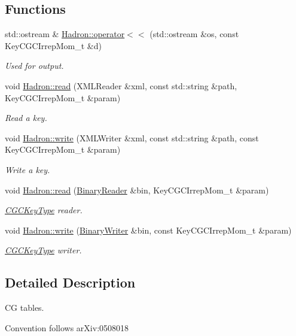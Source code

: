 \subsection*{Functions}
\begin{DoxyCompactItemize}
\item 
std\+::ostream \& \mbox{\hyperlink{namespaceHadron_aa163d93f390345d74a2db05417fba452}{Hadron\+::operator$<$$<$}} (std\+::ostream \&os, const Key\+C\+G\+C\+Irrep\+Mom\+\_\+t \&d)
\begin{DoxyCompactList}\small\item\em Used for output. \end{DoxyCompactList}\item 
void \mbox{\hyperlink{namespaceHadron_ab8d127a4d4a1ca38aae1b0d45226789e}{Hadron\+::read}} (X\+M\+L\+Reader \&xml, const std\+::string \&path, Key\+C\+G\+C\+Irrep\+Mom\+\_\+t \&param)
\begin{DoxyCompactList}\small\item\em Read a key. \end{DoxyCompactList}\item 
void \mbox{\hyperlink{namespaceHadron_a2454ead756c8c4f2b1f75bbf8d3c1070}{Hadron\+::write}} (X\+M\+L\+Writer \&xml, const std\+::string \&path, const Key\+C\+G\+C\+Irrep\+Mom\+\_\+t \&param)
\begin{DoxyCompactList}\small\item\em Write a key. \end{DoxyCompactList}\item 
void \mbox{\hyperlink{namespaceHadron_a0fa916d0de711ad2cf389173ad463f51}{Hadron\+::read}} (\mbox{\hyperlink{classADATIO_1_1BinaryReader}{Binary\+Reader}} \&bin, Key\+C\+G\+C\+Irrep\+Mom\+\_\+t \&param)
\begin{DoxyCompactList}\small\item\em \mbox{\hyperlink{structHadron_1_1CGCKeyType}{C\+G\+C\+Key\+Type}} reader. \end{DoxyCompactList}\item 
void \mbox{\hyperlink{namespaceHadron_ae48dac33aabaaf829859c63a77a06b8b}{Hadron\+::write}} (\mbox{\hyperlink{classADATIO_1_1BinaryWriter}{Binary\+Writer}} \&bin, const Key\+C\+G\+C\+Irrep\+Mom\+\_\+t \&param)
\begin{DoxyCompactList}\small\item\em \mbox{\hyperlink{structHadron_1_1CGCKeyType}{C\+G\+C\+Key\+Type}} writer. \end{DoxyCompactList}\end{DoxyCompactItemize}


\subsection{Detailed Description}
CG tables. 

Convention follows ar\+Xiv\+:0508018 